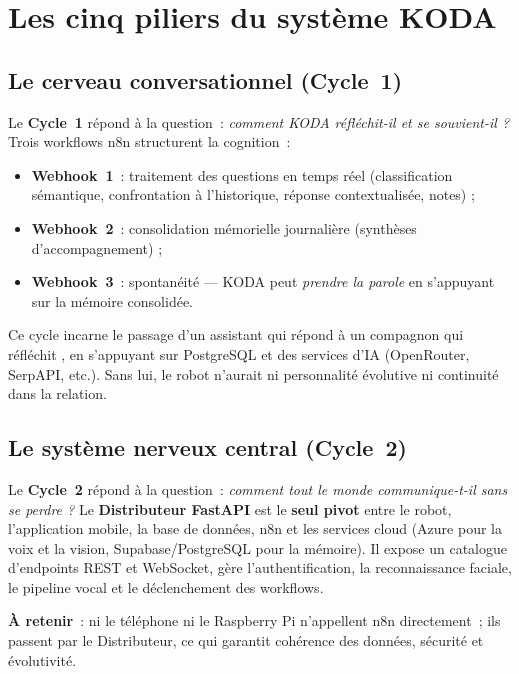 \documentclass[a4paper,12pt]{report}
\begin{document}
	\section{Les cinq piliers du système KODA}
	
	\subsection{Le cerveau conversationnel (Cycle~1)}
	
	Le \textbf{Cycle~1} répond à la question~: \emph{comment KODA réfléchit-il et se
	souvient-il ?} Trois workflows n8n structurent la cognition~:
	\begin{itemize}
		\item \textbf{Webhook~1}~: traitement des questions en temps réel (classification
		sémantique, confrontation à l'historique, réponse contextualisée, notes) ;
		\item \textbf{Webhook~2}~: consolidation mémorielle journalière (synthèses
		d'accompagnement) ;
		\item \textbf{Webhook~3}~: spontanéité --- KODA peut \emph{prendre la parole} en
		s'appuyant sur la mémoire consolidée.
	\end{itemize}
	Ce cycle incarne le passage d'un assistant qui \og répond \fg{} à un compagnon qui
	\og réfléchit \fg{}, en s'appuyant sur PostgreSQL et des services d'IA (OpenRouter,
	SerpAPI, etc.). Sans lui, le robot n'aurait ni personnalité évolutive ni continuité
	dans la relation.
	
	\subsection{Le système nerveux central (Cycle~2)}
	
	Le \textbf{Cycle~2} répond à la question~: \emph{comment tout le monde communique-t-il
	sans se perdre ?} Le \textbf{Distributeur FastAPI} est le \textbf{seul pivot} entre
	le robot, l'application mobile, la base de données, n8n et les services cloud
	(Azure pour la voix et la vision, Supabase/PostgreSQL pour la mémoire). Il expose
	un catalogue d'endpoints REST et WebSocket, gère l'authentification, la
	reconnaissance faciale, le pipeline vocal et le déclenchement des workflows.
	
	\textbf{À retenir}~: ni le téléphone ni le Raspberry Pi n'appellent n8n
	directement~; ils passent par le Distributeur, ce qui garantit cohérence des
	données, sécurité et évolutivité.
	
\end{document}
